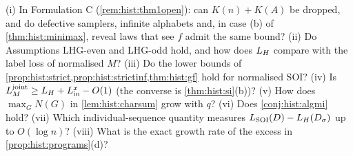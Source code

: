 \begin{question}\label{q:hist:open}
(i) In Formulation C (\cref{rem:hist:thm1open}): can $K(n)+K(A)$ be dropped, and do defective samplers, infinite alphabets and, in case (b) of \cref{thm:hist:minimax}, reveal laws that see $f$ admit the same bound? (ii) Do Assumptions LHG-even and LHG-odd hold, and how does $L_{H}$ compare with the label loss of normalised $M$? (iii) Do the lower bounds of \cref{prop:hist:strict,prop:hist:strictinf,thm:hist:gf} hold for normalised SOI? (iv) Is $L_{M}^{\mathrm{joint}}\ge L_{H}+L^x_{\rm in}-O(1)$ (the converse is \cref{thm:hist:si}(b))? (v) How does $\max_GN(G)$ in \cref{lem:hist:charsum} grow with $q$? (vi) Does \cref{conj:hist:algmi} hold? (vii) Which individual-sequence quantity measures $L_{\mathrm{SOI}}(D)-L_{H}(D_\sigma)$ up to $O(\log n)$? (viii) What is the exact growth rate of the excess in \cref{prop:hist:programs}(d)?
\end{question}
